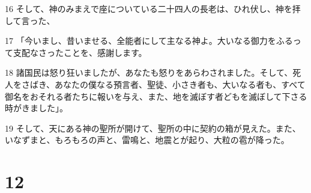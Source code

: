 \par 16 そして、神のみまえで座についている二十四人の長老は、ひれ伏し、神を拝して言った、
\par 17 「今いまし、昔いませる、全能者にして主なる神よ。大いなる御力をふるって支配なさったことを、感謝します。
\par 18 諸国民は怒り狂いましたが、あなたも怒りをあらわされました。そして、死人をさばき、あなたの僕なる預言者、聖徒、小さき者も、大いなる者も、すべて御名をおそれる者たちに報いを与え、また、地を滅ぼす者どもを滅ぼして下さる時がきました」。
\par 19 そして、天にある神の聖所が開けて、聖所の中に契約の箱が見えた。また、いなずまと、もろもろの声と、雷鳴と、地震とが起り、大粒の雹が降った。

\chapter{12}

